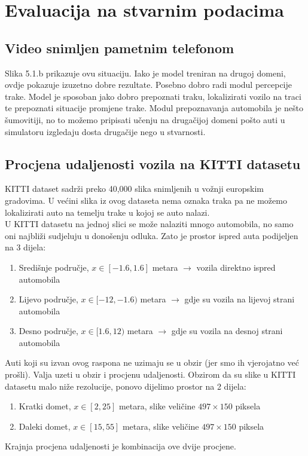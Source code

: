\documentclass[seminar, utf8, numeric]{fer}
\begin{document}
\section{Evaluacija na stvarnim podacima}
\subsection{Video snimljen pametnim telefonom}
Slika 5.1.b prikazuje ovu situaciju. Iako je model treniran na drugoj domeni, ovdje pokazuje izuzetno dobre rezultate. Posebno dobro radi modul percepcije trake. Model je sposoban jako dobro prepoznati traku, lokalizirati vozilo na traci te prepoznati situacije promjene trake. Modul prepoznavanja automobila je nešto šumovitiji, no to možemo pripisati učenju na drugačijoj domeni pošto auti u simulatoru izgledaju dosta drugačije nego u stvarnosti.

\subsection{Procjena udaljenosti vozila na KITTI datasetu}
KITTI dataset sadrži preko 40,000 slika snimljenih u vožnji europskim gradovima. U većini slika iz ovog dataseta nema oznaka traka pa ne možemo lokalizirati auto na temelju trake u kojoj se auto nalazi. \\
U KITTI datasetu na jednoj slici se može nalaziti mnogo automobila, no samo oni najbliži sudjeluju u donošenju odluka. Zato je prostor ispred auta podijeljen na 3 dijela:
\begin{enumerate}
	\item Središnje područje, $x \in [-1.6, 1.6]$ metara $\rightarrow$ vozila direktno ispred automobila
	\item Lijevo područje, $x \in [-12, -1.6)$ metara $\rightarrow$ gdje su vozila na lijevoj strani automobila
	\item Desno područje, $x \in [1.6, 12)$ metara $\rightarrow$ gdje su vozila na desnoj strani automobila
\end{enumerate}
Auti koji su izvan ovog raspona ne uzimaju se u obzir (jer smo ih vjerojatno već prošli). Valja uzeti u obzir i procjenu udaljenosti. Obzirom da su slike u KITTI datasetu malo niže rezolucije, ponovo dijelimo prostor na 2 dijela:
\begin{enumerate}
	\item Kratki domet, $x \in [2, 25]$ metara, slike veličine $497 \times 150$ piksela
	\item Daleki domet, $x \in [15, 55]$ metara, slike veličine $497 \times 150$ piksela
\end{enumerate}
Krajnja procjena udaljenosti je kombinacija ove dvije procjene. 
\end{document}
